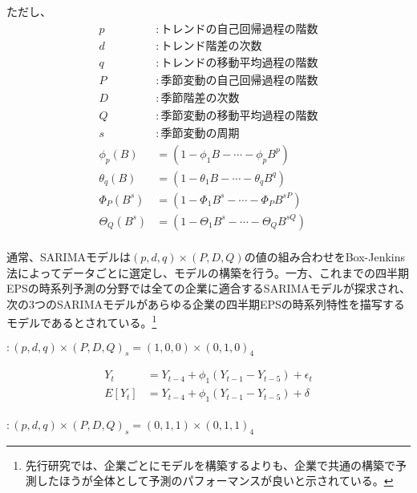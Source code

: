 \documentclass[a4paper, 12pt]{jsreport}
\begin{document}
ただし、
\begin{equation}
  \begin{split}
    p &: トレンドの自己回帰過程の階数 \\
    d &: トレンド階差の次数 \\
    q &: トレンドの移動平均過程の階数 \\
    P &: 季節変動の自己回帰過程の階数 \\
    D &: 季節階差の次数 \\
    Q &: 季節変動の移動平均過程の階数 \\
    s &: 季節変動の周期 \\
    \phi_p(B) &= (1 - \phi_1B - \cdots - \phi_pB^p) \\
    \theta_q(B) &= (1 - \theta_1B - \cdots - \theta_qB^q) \\
    \Phi_P(B^s) &= (1 - \Phi_1B^s - \cdots - \Phi_PB^{sP}) \\
    \Theta_Q(B^s) &= (1 - \Theta_1B^s - \cdots - \Theta_QB^{sQ}) \\
  \end{split}
\end{equation}

通常、SARIMAモデルは$(p, d, q) \times (P, D, Q)$の値の組み合わせをBox-Jenkins法によってデータごとに選定し、モデルの構築を行う。一方、これまでの四半期EPSの時系列予測の分野では全ての企業に適合するSARIMAモデルが探求され、次の3つのSARIMAモデル\citep*{foster1977quarterly, griffin1977time, brown1979univariate}があらゆる企業の四半期EPSの時系列特性を描写するモデルであるとされている。\footnote{先行研究では、企業ごとにモデルを構築するよりも、企業で共通の構築で予測したほうが全体として予測のパフォーマンスが良いと示されている。}

\cite{foster1977quarterly} $: (p, d, q) \times (P, D, Q)_s = (1, 0, 0) \times (0, 1, 0)_4$

\begin{equation}
  \begin{split}
    Y_t &= Y_{t-4} + \phi_1(Y_{t-1} - Y_{t-5}) + \epsilon_t \\
    E[Y_t] &= Y_{t-4} + \phi_1(Y_{t-1} - Y_{t-5}) + \delta \\
  \end{split}
\end{equation}

\cite{griffin1977time} $: (p, d, q) \times (P, D, Q)_s = (0, 1, 1) \times (0, 1, 1)_4$
\end{document}
